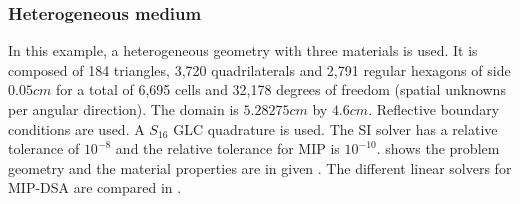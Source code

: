\subsubsection{Heterogeneous medium}

In this example, a heterogeneous geometry with three materials is used. It is 
composed of 184 triangles, 3,720 quadrilaterals and 2,791 regular hexagons of 
side $0.05cm$ for a total of 6,695 cells and 32,178 degrees of freedom (spatial 
unknowns per angular direction). The domain is $5.28275cm$ by $4.6cm$. 
Reflective boundary conditions are used. A $S_{16}$ GLC 
quadrature is used. The SI solver has a relative tolerance of 
$10^{-8}$ and the relative tolerance for MIP is $10^{-10}$. 
shows the problem geometry and the material properties are in given
.
The different linear solvers for MIP-DSA are compared in .
%
